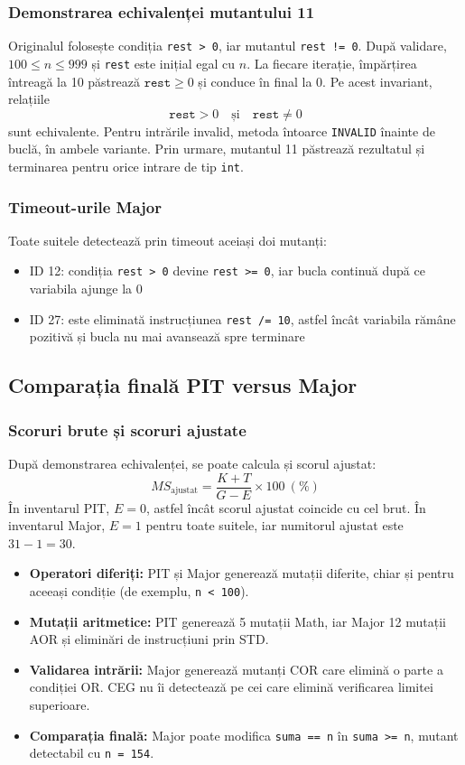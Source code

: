 \documentclass[11pt,a4paper]{article}
\begin{document}
\subsubsection{Demonstrarea echivalenței mutantului 11}
Originalul folosește condiția \texttt{rest > 0}, iar mutantul
\texttt{rest != 0}. După validare, $100\leq n\leq999$ și
\texttt{rest} este inițial egal cu $n$.
La fiecare iterație, împărțirea întreagă la 10 păstrează
$\texttt{rest}\geq0$ și conduce în final la 0.
Pe acest invariant, relațiile
\[
\texttt{rest}>0\quad\text{și}\quad\texttt{rest}\ne0
\]
sunt echivalente. Pentru intrările invalid, metoda întoarce
\texttt{INVALID} înainte de buclă, în ambele variante.
Prin urmare, mutantul 11 păstrează rezultatul și terminarea pentru
orice intrare de tip \texttt{int}.

\subsubsection{Timeout-urile Major}
Toate suitele detectează prin timeout aceiași doi mutanți:
\begin{itemize}[label=\textbullet]
\item ID 12: condiția \texttt{rest > 0} devine \texttt{rest >= 0}, iar bucla continuă după ce variabila ajunge la 0
\item ID 27: este eliminată instrucțiunea \texttt{rest /= 10}, astfel încât variabila rămâne pozitivă și bucla nu mai avansează spre terminare
\end{itemize}

\subsection{Comparația finală PIT versus Major}
\subsubsection{Scoruri brute și scoruri ajustate}
După demonstrarea echivalenței, se poate calcula și scorul ajustat:
\[
MS_{\mathrm{ajustat}}=\frac{K+T}{G-E}\times100\ (\%)
\]
În inventarul PIT, $E=0$, astfel încât scorul ajustat coincide cu cel brut.
În inventarul Major, $E=1$ pentru toate suitele, iar numitorul ajustat
este $31-1=30$.


\begin{itemize}[label=\textbullet]
\item \textbf{Operatori diferiți:} PIT și Major generează mutații diferite, chiar și pentru aceeași condiție (de exemplu, \texttt{n < 100}).
\item \textbf{Mutații aritmetice:} PIT generează 5 mutații Math, iar Major 12 mutații AOR și eliminări de instrucțiuni prin STD.
\item \textbf{Validarea intrării:} Major generează mutanți COR care elimină o parte a condiției OR. CEG nu îi detectează pe cei care elimină verificarea limitei superioare.
\item \textbf{Comparația finală:} Major poate modifica \texttt{suma == n} în \texttt{suma >= n}, mutant detectabil cu \texttt{n = 154}.
\end{itemize}
\end{document}
